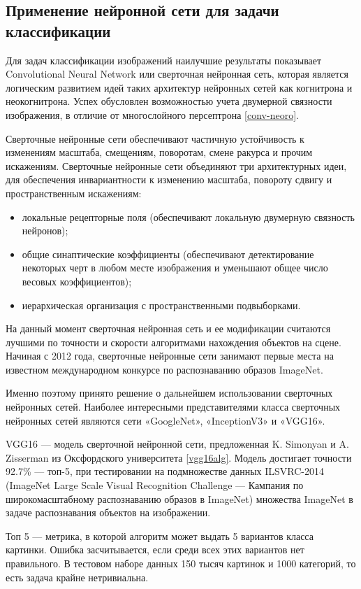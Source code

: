 \subsection{Применение нейронной сети для задачи классификации}

Для задач классификации изображений наилучшие результаты показывает Convolutional Neural Network или сверточная нейронная сеть, которая является логическим развитием идей таких архитектур нейронных сетей как когнитрона и неокогнитрона. 
Успех обусловлен возможностью учета двумерной связности изображения, в отличие от многослойного персептрона \ref{conv-neoro}. 

Сверточные нейронные сети обеспечивают частичную устойчивость к изменениям масштаба, смещениям, поворотам, смене ракурса и прочим искажениям. 
Сверточные нейронные сети объединяют три архитектурных идеи, для обеспечения инвариантности к изменению масштаба, повороту сдвигу и пространственным искажениям:
\begin{itemize}
    \item локальные рецепторные поля (обеспечивают локальную двумерную связность нейронов);
    \item общие синаптические коэффициенты (обеспечивают детектирование некоторых черт в любом месте изображения и уменьшают общее число весовых коэффициентов);
    \item иерархическая организация с пространственными подвыборками.
\end{itemize}

На данный момент сверточная нейронная сеть и ее модификации считаются лучшими по точности и скорости алгоритмами нахождения объектов на сцене. 
Начиная с 2012 года, сверточные нейронные сети занимают первые места на известном международном конкурсе по распознаванию образов ImageNet.

Именно поэтому принято решение о дальнейшем использовании сверточных нейронных сетей. 
Наиболее интересными представителями класса сверточных нейронных сетей являются сети «GoogleNet», «InceptionV3» и «VGG16».

VGG16 — модель сверточной нейронной сети, предложенная K. Simonyan и A. Zisserman из Оксфордского университета \ref{vgg16alg}. 
Модель достигает точности 92.7\% — топ-5, при тестировании на подмножестве данных ILSVRC-2014 (ImageNet Large Scale Visual Recognition Challenge — Кампания по широкомасштабному распознаванию образов в ImageNet) множества ImageNet в задаче распознавания объектов на изображении. 

Топ 5 — метрика, в которой алгоритм может выдать 5 вариантов класса картинки. Ошибка засчитывается, если среди всех этих вариантов нет правильного. В тестовом наборе данных 150 тысяч картинок и 1000 категорий, то есть задача крайне нетривиальна.

